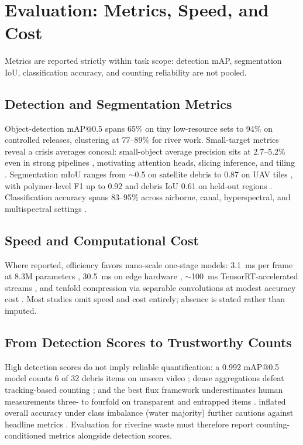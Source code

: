 \section{Evaluation: Metrics, Speed, and Cost}
\label{sec:evaluation}

Metrics are reported strictly within task scope: detection mAP, segmentation IoU, classification accuracy, and counting reliability are not pooled.

\subsection{Detection and Segmentation Metrics}
Object-detection mAP@0.5 spans 65\% on tiny low-resource sets to 94\% on controlled releases, clustering at 77--89\% for river work. Small-target metrics reveal a crisis averages conceal: small-object average precision sits at 2.7--5.2\% even in strong pipelines \cite{Tharani2021}, motivating attention heads, slicing inference, and tiling \cite{Lin2021,JiaFlux2025,FrontEnv2025}. Segmentation mIoU ranges from $\sim$0.5 on satellite debris to 0.87 on UAV tiles \cite{SoleGomez2022,Pati2025}, with polymer-level F1 up to 0.92 \cite{Jakovljevic2020} and debris IoU 0.61 on held-out regions \cite{SoleGomez2022}. Classification accuracy spans 83--95\% across airborne, canal, hyperspectral, and multispectral settings \cite{Wolf2020,JiaFrontiers2023,Tasseron2022,Cortesi2022}.

\subsection{Speed and Computational Cost}
Where reported, efficiency favors nano-scale one-stage models: 3.1~ms per frame at 8.3M parameters \cite{Liu2025}, 30.5~ms on edge hardware \cite{Yan2025}, $\sim$100~ms TensorRT-accelerated streams \cite{FrontEnv2025}, and tenfold compression via separable convolutions at modest accuracy cost \cite{Tharani2021}. Most studies omit speed and cost entirely; absence is stated rather than imputed.

\subsection{From Detection Scores to Trustworthy Counts}
High detection scores do not imply reliable quantification: a 0.992 mAP@0.5 model counts 6 of 32 debris items on unseen video \cite{Lee2025}; dense aggregations defeat tracking-based counting \cite{FrontEnv2025}; and the best flux framework underestimates human measurements three- to fourfold on transparent and entrapped items \cite{JiaFlux2025}. inflated overall accuracy under class imbalance (water majority) further cautions against headline metrics \cite{Mohsen2023}. Evaluation for riverine waste must therefore report counting-conditioned metrics alongside detection scores.
